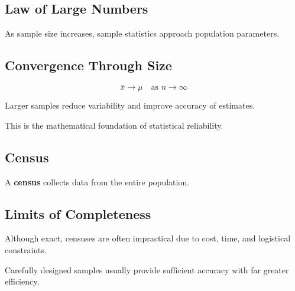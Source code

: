 \documentclass[11pt]{article}
\begin{document}
\begin{tcolorbox}[mybox]
\section*{Law of Large Numbers}

As sample size increases, sample statistics approach population parameters.

\subsection*{Convergence Through Size}

\[
\bar{x} \to \mu \quad \text{as } n \to \infty
\]

Larger samples reduce variability and improve accuracy of estimates.

This is the mathematical foundation of statistical reliability.
\end{tcolorbox}


\begin{tcolorbox}[mybox]
\section*{Census}

A \textbf{census} collects data from the entire population.

\subsection*{Limits of Completeness}

Although exact, censuses are often impractical due to cost, time, and logistical constraints.

Carefully designed samples usually provide sufficient accuracy with far greater efficiency.
\end{tcolorbox}
\end{document}
